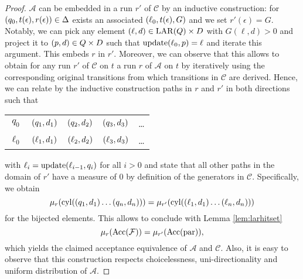 \begin{proof}
  $\mathcal{A}$ can be embedded in a run $r'$ of $\mathcal{C}$ by an 
  inductive construction: for $\left(q_{0}, t(\epsilon), r(\epsilon)\right)\in
  \Delta$ exists an associated $\left(\ell_{0}, t(\epsilon), G\right)$ and we set
  $r'(\epsilon) = G$. Notably, we can pick any element 
  $\left(\ell, d\right)\in\operatorname{LAR}(Q)\times D$ with $G(\ell, d) > 0$ and project it to
  $\left(p, d\right)\in Q\times D$ such that $\operatorname{update}(\ell_{0}, p) = \ell$ and iterate
  this argument. This embeds $r$ in $r'$. Moreover, we can observe that this 
  allows to obtain for any run $r'$ of $\mathcal{C}$ on $t$ a run $r$ of 
  $\mathcal{A}$ on $t$ by iteratively using the corresponding original 
  transitions from which transitions in $\mathcal{C}$ are derived. Hence, 
  we can relate by the inductive construction paths in $r$ and $r'$ in both 
  directions such that
  \begin{center}
    \begin{tabular}{ccccc}
      $q_{0}$ & $\left(q_{1}, d_{1}\right)$ & $\left(q_{2}, d_{2}\right)$ & 
        $\left(q_{3}, d_{3}\right)$ & \dots\\
      $\ell_{0}$ & $\left(\ell_{1}, d_{1}\right)$ & $\left(\ell_{2}, d_{2}\right)$ & 
        $\left(\ell_{3}, d_{3}\right)$ & \dots
    \end{tabular}
  \end{center}
  with $\ell_{i} = \operatorname{update}(\ell_{i-1}, q_{i})$ for all $i>0$ and state that all 
  other paths in the domain of $r'$ have a measure of $0$ by definition of the
  generators in $\mathcal{C}$. Specifically, we obtain
  \begin{equation*}
    \mu_{r}(\operatorname{cyl}(\left(q_{1},d_{1}\right)\dots\left(q_{n},d_{n}\right))) = 
      \mu_{r'}(\operatorname{cyl}(\left(\ell_{1},d_{1}\right)\dots\left(\ell_{n},d_{n}\right)))
  \end{equation*}
  for the bijected elements. This allows to conclude with Lemma
  \ref{lem:larhitset}
  \begin{equation*}
    \mu_{r}(\operatorname{Acc}(\mathcal{F})) = \mu_{r'}(\operatorname{Acc}(\operatorname{par})),
  \end{equation*} 
  which yields the claimed acceptance equivalence of $\mathcal{A}$ and 
  $\mathcal{C}$. Also, it is easy to observe that this construction respects
  choicelessness, uni-directionality and uniform distribution of $\mathcal{A}$.
\end{proof}


